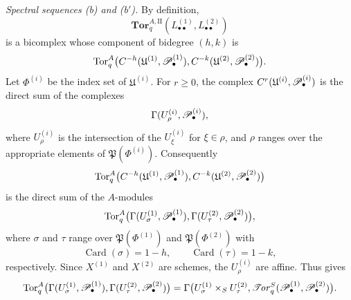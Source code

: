 \begin{env}[6.6.4]
\label{III.6.6.4}
\emph{Spectral sequences \textnormal{(b)} and
\textnormal{(b$'$)}.}
By definition,
\[
  \mathbf{Tor}_q^{A,\mathrm{II}}
  (L_{\bullet\bullet}^{(1)},L_{\bullet\bullet}^{(2)})
\]
is a bicomplex whose component of bidegree $(h,k)$ is
\[
  \operatorname{Tor}_q^A
  \bigl(
    C^{-h}(\mathfrak U^{(1)},\mathscr{P}_\bullet^{(1)}),
    C^{-k}(\mathfrak U^{(2)},\mathscr{P}_\bullet^{(2)})
  \bigr).
\]
Let $\Phi^{(i)}$ be the index set of $\mathfrak U^{(i)}$.  For
$r\geq0$, the complex
$C^r(\mathfrak U^{(i)},\mathscr{P}_\bullet^{(i)})$ is the direct sum
of the complexes
\[
  \Gamma(U_\rho^{(i)},\mathscr{P}_\bullet^{(i)}),
\]
where $U_\rho^{(i)}$ is the intersection of the
$U_\xi^{(i)}$ for $\xi\in\rho$, and $\rho$ ranges over the
appropriate elements of $\mathfrak P(\Phi^{(i)})$.
Consequently
\[
  \operatorname{Tor}_q^A
  \bigl(
    C^{-h}(\mathfrak U^{(1)},\mathscr{P}_\bullet^{(1)}),
    C^{-k}(\mathfrak U^{(2)},\mathscr{P}_\bullet^{(2)})
  \bigr)
\]
is the direct sum of the $A$-modules
\[
  \operatorname{Tor}_q^A
  \bigl(
    \Gamma(U_\sigma^{(1)},\mathscr{P}_\bullet^{(1)}),
    \Gamma(U_\tau^{(2)},\mathscr{P}_\bullet^{(2)})
  \bigr),
\]
where $\sigma$ and $\tau$ range over
$\mathfrak P(\Phi^{(1)})$ and $\mathfrak P(\Phi^{(2)})$ with
\[
  \operatorname{Card}(\sigma)=1-h,
  \qquad
  \operatorname{Card}(\tau)=1-k,
\]
respectively.  Since $X^{(1)}$ and $X^{(2)}$ are schemes, the
$U_\rho^{(i)}$ are affine.  Thus  gives
\[
  \operatorname{Tor}_q^A
  \bigl(
    \Gamma(U_\sigma^{(1)},\mathscr{P}_\bullet^{(1)}),
    \Gamma(U_\tau^{(2)},\mathscr{P}_\bullet^{(2)})
  \bigr)
  =
  \Gamma\bigl(
    U_\sigma^{(1)}\times_SU_\tau^{(2)},
    \mathscr{T}\!\mathit{or}_q^S(\mathscr{P}_\bullet^{(1)},\mathscr{P}_\bullet^{(2)})
  \bigr).
\]



\end{env}
